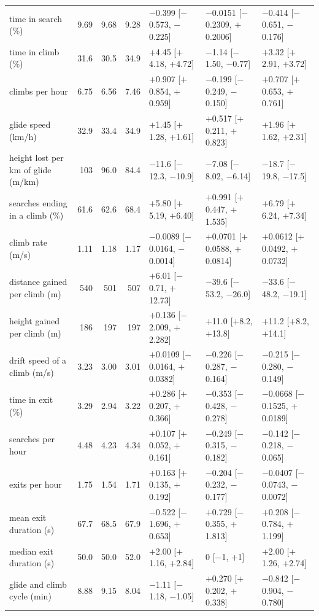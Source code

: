 \begin{tabular}{@{}l r r r l l l@{}}
time in search (\%) & 9.69 & 9.68 & 9.28 & $-$0.399 [$-$0.573, $-$0.225] & $-$0.0151 [$-$0.2309, $+$0.2006] & $-$0.414 [$-$0.651, $-$0.176] \\
time in climb (\%) & 31.6 & 30.5 & 34.9 & $+$4.45 [$+$4.18, $+$4.72] & $-$1.14 [$-$1.50, $-$0.77] & $+$3.32 [$+$2.91, $+$3.72] \\
climbs per hour & 6.75 & 6.56 & 7.46 & $+$0.907 [$+$0.854, $+$0.959] & $-$0.199 [$-$0.249, $-$0.150] & $+$0.707 [$+$0.653, $+$0.761] \\
glide speed (km/h) & 32.9 & 33.4 & 34.9 & $+$1.45 [$+$1.28, $+$1.61] & $+$0.517 [$+$0.211, $+$0.823] & $+$1.96 [$+$1.62, $+$2.31] \\
height lost per km of glide (m/km) & 103 & 96.0 & 84.4 & $-$11.6 [$-$12.3, $-$10.9] & $-$7.08 [$-$8.02, $-$6.14] & $-$18.7 [$-$19.8, $-$17.5] \\
searches ending in a climb (\%) & 61.6 & 62.6 & 68.4 & $+$5.80 [$+$5.19, $+$6.40] & $+$0.991 [$+$0.447, $+$1.535] & $+$6.79 [$+$6.24, $+$7.34] \\
climb rate (m/s) & 1.11 & 1.18 & 1.17 & $-$0.0089 [$-$0.0164, $-$0.0014] & $+$0.0701 [$+$0.0588, $+$0.0814] & $+$0.0612 [$+$0.0492, $+$0.0732] \\
distance gained per climb (m) & 540 & 501 & 507 & $+$6.01 [$-$0.71, $+$12.73] & $-$39.6 [$-$53.2, $-$26.0] & $-$33.6 [$-$48.2, $-$19.1] \\
height gained per climb (m) & 186 & 197 & 197 & $+$0.136 [$-$2.009, $+$2.282] & $+$11.0 [$+$8.2, $+$13.8] & $+$11.2 [$+$8.2, $+$14.1] \\
drift speed of a climb (m/s) & 3.23 & 3.00 & 3.01 & $+$0.0109 [$-$0.0164, $+$0.0382] & $-$0.226 [$-$0.287, $-$0.164] & $-$0.215 [$-$0.280, $-$0.149] \\
time in exit (\%) & 3.29 & 2.94 & 3.22 & $+$0.286 [$+$0.207, $+$0.366] & $-$0.353 [$-$0.428, $-$0.278] & $-$0.0668 [$-$0.1525, $+$0.0189] \\
searches per hour & 4.48 & 4.23 & 4.34 & $+$0.107 [$+$0.052, $+$0.161] & $-$0.249 [$-$0.315, $-$0.182] & $-$0.142 [$-$0.218, $-$0.065] \\
exits per hour & 1.75 & 1.54 & 1.71 & $+$0.163 [$+$0.135, $+$0.192] & $-$0.204 [$-$0.232, $-$0.177] & $-$0.0407 [$-$0.0743, $-$0.0072] \\
mean exit duration (s) & 67.7 & 68.5 & 67.9 & $-$0.522 [$-$1.696, $+$0.653] & $+$0.729 [$-$0.355, $+$1.813] & $+$0.208 [$-$0.784, $+$1.199] \\
median exit duration (s) & 50.0 & 50.0 & 52.0 & $+$2.00 [$+$1.16, $+$2.84] & 0 [$-$1, $+$1] & $+$2.00 [$+$1.26, $+$2.74] \\
glide and climb cycle (min) & 8.88 & 9.15 & 8.04 & $-$1.11 [$-$1.18, $-$1.05] & $+$0.270 [$+$0.202, $+$0.338] & $-$0.842 [$-$0.904, $-$0.780] \\
\bottomrule
\end{tabular}
